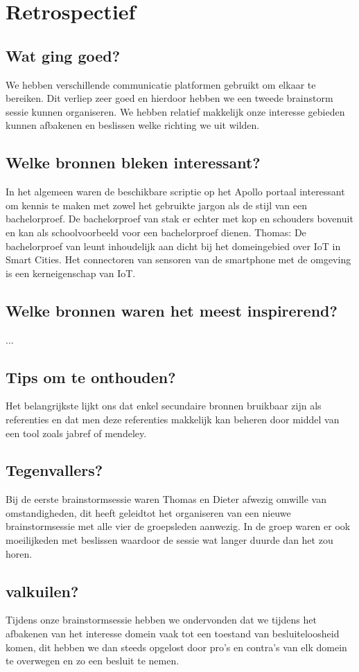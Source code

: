 \documentclass[fleqn,10pt]{voorstel}
\begin{document}
\section{Retrospectief}
\subsection{Wat ging goed?}
We hebben verschillende communicatie platformen gebruikt om elkaar te bereiken. Dit verliep zeer goed en hierdoor hebben we een tweede brainstorm sessie kunnen organiseren.
We hebben relatief makkelijk onze interesse gebieden kunnen afbakenen en beslissen welke richting we uit wilden.
\subsection{Welke bronnen bleken interessant?}
In het algemeen waren de beschikbare scriptie op het Apollo portaal interessant om kennis te maken met zowel het gebruikte jargon als de stijl van een bachelorproef. De bachelorproef van stak er echter met kop en schouders bovenuit en kan als schoolvoorbeeld voor een bachelorproef dienen.
Thomas: De bachelorproef van leunt inhoudelijk aan dicht bij het domeingebied over IoT in Smart Cities. Het connectoren van sensoren van de smartphone met de omgeving is een kerneigenschap van IoT.
\subsection{Welke bronnen waren het meest inspirerend?}
...
\subsection{Tips om te onthouden?}
Het belangrijkste lijkt ons dat enkel secundaire bronnen bruikbaar zijn als referenties en dat men deze referenties makkelijk kan beheren door middel van een tool zoals jabref of mendeley.
\subsection{Tegenvallers?}
Bij de eerste brainstormsessie waren Thomas en Dieter afwezig omwille van omstandigheden, dit heeft geleidtot het organiseren van een nieuwe brainstormsessie met alle vier de groepsleden aanwezig. In de groep waren er ook
moeilijkeden met beslissen waardoor de sessie wat langer duurde dan het zou horen.
\subsection{valkuilen?}
Tijdens onze brainstormsessie hebben we ondervonden dat we tijdens het afbakenen van het interesse domein vaak tot een toestand van besluiteloosheid komen, dit hebben we dan steeds opgelost door pro's en contra's van elk domein te overwegen en zo een besluit te nemen. 
\end{document}
